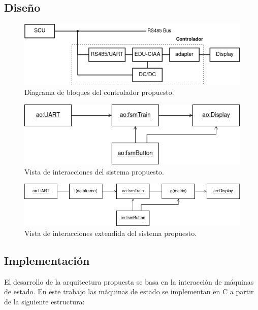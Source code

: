 \pagebreak
\subsection{Diseño}


\begin{figure}[ht]
	\centering
	\includegraphics[width=1\textwidth]{./Figures/diagVistaReDisenhoEduCIAA.png}
	\caption{Diagrama de bloques del controlador propuesto.}
	\label{fig:diagVistaReDisenhoEduCIAA}
\end{figure}


\begin{figure}[ht]
	\centering
	\includegraphics[width=1\textwidth]{./Figures/diagVistaDisenho.png}
	\caption{Vista de interacciones del sistema propuesto.}
	\label{fig:diagVistaDisenho}
\end{figure}

\begin{figure}[ht]
	\centering
	\includegraphics[width=1\textwidth]{./Figures/diagVistaDisenhoExtendida.png}
	\caption{Vista de interacciones extendida del sistema propuesto.}
	\label{fig:diagVistaDisenhoExtendida}
\end{figure}

\pagebreak
\subsection{Implementación}

El desarrollo de la arquitectura propuesta se basa en la interacción de máquinas de estado.
En este trabajo las máquinas de estado se implementan en C a partir de la siguiente estructura:

